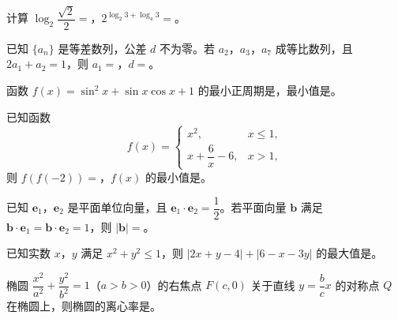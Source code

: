 \begin{question}
计算 \(\log_2\dfrac{\sqrt{2}}{2}=\)\gkblank{}，\(2^{\log_2 3+\log_4 3}=\)\gkblank{}。

\end{question}
\begin{question}
已知 \(\{a_n\}\) 是等差数列，公差 \(d\) 不为零。若 \(a_2\)，\(a_3\)，\(a_7\) 成等比数列，且 \(2a_1+a_2=1\)，则 \(a_1=\)\gkblank{}，\(d=\)\gkblank{}。

\end{question}
\begin{question}
函数 \(f(x)=\sin^2x+\sin x\cos x+1\) 的最小正周期是\gkblank{}，最小值是\gkblank{}。

\end{question}
\begin{question}
已知函数
\nopagebreak[4]
\[
f(x)=\begin{cases}
x^2, & x\leqslant1,\\
x+\dfrac{6}{x}-6, & x>1,
\end{cases}
\]
则 \(f(f(-2))=\)\gkblank{}，\(f(x)\) 的最小值是\gkblank{}。

\end{question}
\begin{question}
已知 \(\boldsymbol{e}_1\)，\(\boldsymbol{e}_2\) 是平面单位向量，且 \(\boldsymbol{e}_1\cdot\boldsymbol{e}_2=\dfrac{1}{2}\)。若平面向量 \(\boldsymbol{b}\) 满足 \(\boldsymbol{b}\cdot\boldsymbol{e}_1=\boldsymbol{b}\cdot\boldsymbol{e}_2=1\)，则 \(|\boldsymbol{b}|=\)\gkblank{}。

\end{question}
\begin{question}
已知实数 \(x\)，\(y\) 满足 \(x^2+y^2\leqslant1\)，则 \(|2x+y-4|+|6-x-3y|\) 的最大值是\gkblank{}。

\end{question}
\begin{question}
椭圆 \(\dfrac{x^2}{a^2}+\dfrac{y^2}{b^2}=1\)（\(a>b>0\)）的右焦点 \(F(c,0)\) 关于直线 \(y=\dfrac{b}{c}x\) 的对称点 \(Q\) 在椭圆上，则椭圆的离心率是\gkblank{}。

\end{question}

